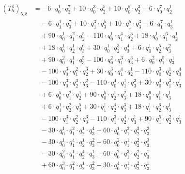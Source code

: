 \begin{align*}(T_{h}^4)_{5,8}&=-6\cdot q_0^{1}\cdot q_2^{7}+10\cdot q_0^{3}\cdot q_2^{5}+10\cdot q_0^{5}\cdot q_2^{3}-6\cdot q_0^{7}\cdot q_2^{1}\\
&\quad -6\cdot q_1^{1}\cdot q_3^{7}+10\cdot q_1^{3}\cdot q_3^{5}+10\cdot q_1^{5}\cdot q_3^{3}-6\cdot q_1^{7}\cdot q_3^{1}\\
&\quad +90\cdot q_0^{1}\cdot q_1^{2}\cdot q_2^{5}-110\cdot q_0^{1}\cdot q_1^{4}\cdot q_2^{3}+18\cdot q_0^{1}\cdot q_1^{6}\cdot q_2^{1}\\
&\quad +18\cdot q_0^{1}\cdot q_2^{1}\cdot q_3^{6}+30\cdot q_0^{1}\cdot q_2^{3}\cdot q_3^{4}+6\cdot q_0^{1}\cdot q_2^{5}\cdot q_3^{2}\\
&\quad +90\cdot q_0^{2}\cdot q_1^{1}\cdot q_3^{5}-100\cdot q_0^{2}\cdot q_1^{3}\cdot q_3^{3}+6\cdot q_0^{2}\cdot q_1^{5}\cdot q_3^{1}\\
&\quad -100\cdot q_0^{3}\cdot q_1^{2}\cdot q_2^{3}+30\cdot q_0^{3}\cdot q_1^{4}\cdot q_2^{1}-110\cdot q_0^{3}\cdot q_2^{1}\cdot q_3^{4}\\
&\quad -100\cdot q_0^{3}\cdot q_2^{3}\cdot q_3^{2}-110\cdot q_0^{4}\cdot q_1^{1}\cdot q_3^{3}+30\cdot q_0^{4}\cdot q_1^{3}\cdot q_3^{1}\\
&\quad +6\cdot q_0^{5}\cdot q_1^{2}\cdot q_2^{1}+90\cdot q_0^{5}\cdot q_2^{1}\cdot q_3^{2}+18\cdot q_0^{6}\cdot q_1^{1}\cdot q_3^{1}\\
&\quad +6\cdot q_1^{1}\cdot q_2^{2}\cdot q_3^{5}+30\cdot q_1^{1}\cdot q_2^{4}\cdot q_3^{3}+18\cdot q_1^{1}\cdot q_2^{6}\cdot q_3^{1}\\
&\quad -100\cdot q_1^{3}\cdot q_2^{2}\cdot q_3^{3}-110\cdot q_1^{3}\cdot q_2^{4}\cdot q_3^{1}+90\cdot q_1^{5}\cdot q_2^{2}\cdot q_3^{1}\\
&\quad -30\cdot q_0^{1}\cdot q_1^{2}\cdot q_2^{1}\cdot q_3^{4}+60\cdot q_0^{1}\cdot q_1^{2}\cdot q_2^{3}\cdot q_3^{2}\\
&\quad -30\cdot q_0^{1}\cdot q_1^{4}\cdot q_2^{1}\cdot q_3^{2}+60\cdot q_0^{2}\cdot q_1^{1}\cdot q_2^{2}\cdot q_3^{3}\\
&\quad -30\cdot q_0^{2}\cdot q_1^{1}\cdot q_2^{4}\cdot q_3^{1}+60\cdot q_0^{2}\cdot q_1^{3}\cdot q_2^{2}\cdot q_3^{1}\\
&\quad +60\cdot q_0^{3}\cdot q_1^{2}\cdot q_2^{1}\cdot q_3^{2}-30\cdot q_0^{4}\cdot q_1^{1}\cdot q_2^{2}\cdot q_3^{1}\end{align*}
